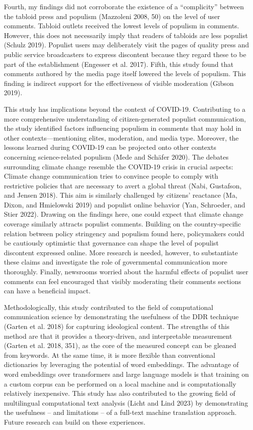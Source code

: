 \documentclass[
]{ccr}
\begin{document}
Fourth, my findings did not corroborate the existence of a
``complicity'' between the tabloid press and populism (Mazzoleni 2008,
50) on the level of user comments. Tabloid outlets received the lowest
levels of populism in comments. However, this does not necessarily imply
that readers of tabloids are less populist (Schulz 2019). Populist users
may deliberately visit the pages of quality press and public service
broadcasters to express discontent because they regard these to be part
of the establishment (Engesser et al. 2017). Fifth, this study found
that comments authored by the media page itself lowered the levels of
populism. This finding is indirect support for the effectiveness of
visible moderation (Gibson 2019).

This study has implications beyond the context of COVID-19. Contributing
to a more comprehensive understanding of citizen-generated populist
communication, the study identified factors influencing populism in
comments that may hold in other contexts---mentioning elites,
moderation, and media type. Moreover, the lessons learned during
COVID-19 can be projected onto other contexts concerning science-related
populism (Mede and Schäfer 2020). The debates surrounding climate change
resemble the COVID-19 crisis in crucial aspects: Climate change
communication tries to convince people to comply with restrictive
policies that are necessary to avert a global threat (Nabi, Gustafson,
and Jensen 2018). This aim is similarly challenged by citizens'
reactance (Ma, Dixon, and Hmielowski 2019) and populist online behavior
(Yan, Schroeder, and Stier 2022). Drawing on the findings here, one
could expect that climate change coverage similarly attracts populist
comments. Building on the country-specific relation between policy
stringency and populism found here, policymakers could be cautiously
optimistic that governance can shape the level of populist discontent
expressed online. More research is needed, however, to substantiate
these claims and investigate the role of governmental communication more
thoroughly. Finally, newsrooms worried about the harmful effects of
populist user comments can feel encouraged that visibly moderating their
comments sections can have a beneficial impact.

Methodologically, this study contributed to the field of computational
communication science by demonstrating the usefulness of the DDR
technique (Garten et al. 2018) for capturing ideological content. The
strengths of this method are that it provides a theory-driven, and
interpretable measurement (Garten et al. 2018, 351), as the core of the
measured concept can be gleaned from keywords. At the same time, it is
more flexible than conventional dictionaries by leveraging the potential
of word embeddings. The advantage of word embeddings over transformers
and large language models is that training on a custom corpus can be
performed on a local machine and is computationally relatively
inexpensive. This study has also contributed to the growing field of
multilingual computational text analysis (Licht and Lind 2023) by
demonstrating the usefulness -- and limitations -- of a full-text
machine translation approach. Future research can build on these
experiences.
\end{document}
